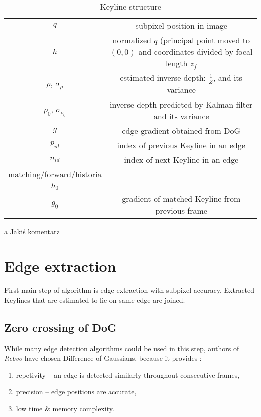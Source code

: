 \begin{table}[ht]
	\centering
	
	\begin{threeparttable}
		\caption{Keyline structure}
		\label{tab:keyline}
		
		\begin{tabularx}{0.6\textwidth}{C{1} C{1}}
			\toprule
			 &  \\
			\midrule
			$q$ & subpixel position in image \\
			$h$ & normalized $q$ (principal point moved to $(0,0)$ and coordinates divided by focal length $z_f$ \\
			$\rho$, $\sigma_{\rho}$ & estimated inverse depth: $\frac{1}{Z}$, and its variance \\
			$\rho_0$, $\sigma_{\rho_{0}}$ & inverse depth predicted by Kalman filter and its variance \\
			$g$ & edge gradient obtained from DoG \\
			$p_{id}$ & index of previous Keyline in an edge \\
			$n_{id}$ & index of next Keyline in an edge \\
			
			matching/forward/historia \\
			$h_0$ &  \\
			$g_{0}$ & gradient of matched Keyline from previous frame \\
			\bottomrule
		\end{tabularx}
		
		\begin{tablenotes}
			\footnotesize
			\item[a] Jakiś komentarz\textellipsis
		\end{tablenotes}
		
	\end{threeparttable}
\end{table}


\section{Edge extraction}

First main step of algorithm is edge extraction with subpixel accuracy. Extracted Keylines that are estimated to lie on same edge are joined.

\subsection{Zero crossing of DoG}
While many edge detection algorithms could be used in this step, authors of \textit{Rebvo} have chosen Difference of Gaussians, because it provides \cite{jose2015realtime}:
\begin{enumerate}
	\item repetivity -- an edge is detected similarly throughout consecutive frames,
	\item precision -- edge positions are accurate,
	\item low time \& memory complexity.
\end{enumerate}

